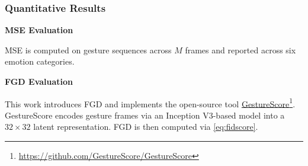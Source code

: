 \subsubsection{Quantitative Results}

\textbf{MSE Evaluation}
\label{subsec:MSEResult}

MSE is computed on gesture sequences across $M$ frames and reported across six emotion categories.

\begin{table}[h]
	\centering
	\caption{MSE results across six emotion categories}
	\label{table:EvaluationMSE}
\end{table}

\textbf{FGD Evaluation}

This work introduces FGD and implements the open-source tool \hyperlink{https://github.com/GestureScore/GestureScore}{GestureScore}\footnote{\url{https://github.com/GestureScore/GestureScore}}. GestureScore encodes gesture frames via an Inception V3-based model into a $32 \times 32$ latent representation. FGD is then computed via \autoref{eq:fidscore}.

\begin{table}[h]
	\centering
	\caption{FGD results for DeepGesture on $\bx^{1:M \times D}$}
	\label{table:EvalFGD}
\end{table}

